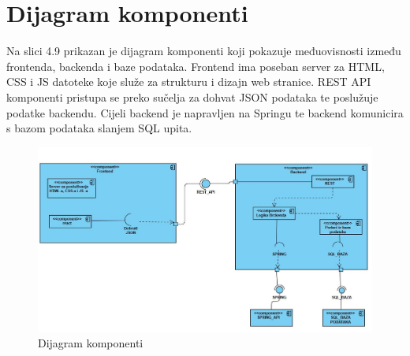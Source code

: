 			
			
			\eject
		\section{Dijagram komponenti}

		{Na slici 4.9 prikazan je dijagram komponenti koji pokazuje međuovisnosti između frontenda, backenda i baze podataka. Frontend ima poseban server za HTML, CSS i JS datoteke koje služe za strukturu i dizajn web stranice. REST API komponenti pristupa se preko sučelja za dohvat JSON podataka te poslužuje podatke backendu. 
		Cijeli backend je napravljen na Springu te backend komunicira s bazom podataka slanjem SQL upita.}
		
			\begin{figure}[H]
				\includegraphics[width=\linewidth]{slike/dijagram komponenti.JPG}
				\centering
				\caption{Dijagram komponenti}
				\label{fig:Dijagram komponenti}
			\end{figure}			%
		

